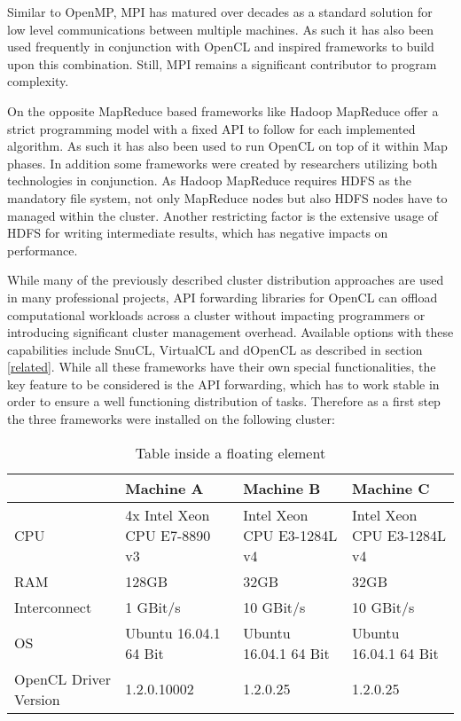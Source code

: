 Similar to OpenMP, MPI has matured over decades as a standard solution for low level communications between multiple machines. As such it has also been used frequently in conjunction with OpenCL and inspired frameworks to build upon this combination. Still, MPI remains a significant contributor to program complexity.

On the opposite MapReduce based frameworks like Hadoop MapReduce offer a strict programming model with a fixed API to follow for each implemented algorithm. As such it has also been used to run OpenCL on top of it within Map phases. In addition some frameworks were created by researchers utilizing both technologies in conjunction. As Hadoop MapReduce requires HDFS as the mandatory file system, not only MapReduce nodes but also HDFS nodes have to managed within the cluster. Another restricting factor is the extensive usage of HDFS for writing intermediate results, which has negative impacts on performance.

While many of the previously described cluster distribution approaches are used in many professional projects, API forwarding libraries for OpenCL can offload computational workloads across a cluster without impacting programmers or introducing significant cluster management overhead. Available options with these capabilities include SnuCL, VirtualCL and dOpenCL as described in section \ref{related}. While all these frameworks have their own special functionalities, the key feature to be considered is the API forwarding, which has to work stable in order to ensure a well functioning distribution of tasks. Therefore as a first step the three frameworks were installed on the following cluster:

\begin{table}
  \centering
    \begin{adjustbox}{width=1\textwidth}
    \small
    \begin{tabular}{l | l | l | l}
    ~                     & Machine A                    & Machine B                  & Machine C                  \\
    \hline
    CPU                   & 4x Intel Xeon CPU E7-8890 v3 & Intel Xeon CPU E3-1284L v4 & Intel Xeon CPU E3-1284L v4 \\
    RAM                   & 128GB                        & 32GB                       & 32GB                       \\
    Interconnect          & 1 GBit/s                     & 10 GBit/s                  & 10 GBit/s                  \\
    OS                    & Ubuntu 16.04.1 64 Bit        & Ubuntu 16.04.1 64 Bit      & Ubuntu 16.04.1 64 Bit      \\
    OpenCL Driver Version & 1.2.0.10002                  & 1.2.0.25                   & 1.2.0.25                   \\
    \end{tabular}
    \end{adjustbox}

    \caption{Table inside a floating element}
    \label{table:ta}
\end{table}

